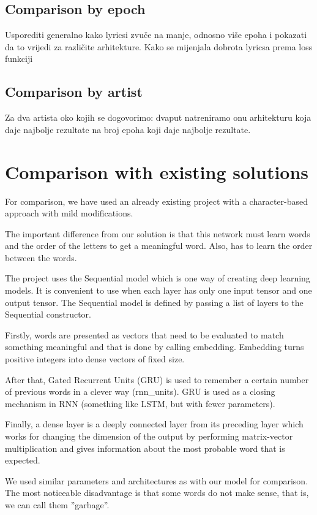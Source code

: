 \documentclass[conference]{IEEEtran}
\begin{document}
\subsection{Comparison by epoch}
Usporediti generalno kako lyricsi zvuče na manje, odnosno više epoha i pokazati
da to vrijedi za različite arhitekture.
Kako se mijenjala dobrota lyricsa prema loss funkciji
\subsection{Comparison by artist}
Za dva artista oko kojih se dogovorimo: dvaput natreniramo onu arhitekturu koja
daje najbolje rezultate na broj epoha koji daje najbolje rezultate.

\section{Comparison with existing solutions}
For comparison, we have used an already existing project with a character-based approach with mild modifications.

The important difference from our solution is that this network must learn words and the order of the letters to get a meaningful word.
Also, has to learn the order between the words.

The project uses the Sequential model which is one way of creating deep learning models. 
It is convenient to use when each layer has only one input tensor and one output
tensor. The Sequential model is defined by passing a list of layers to the Sequential
constructor.

Firstly, words are presented as vectors that need to be evaluated to match
something meaningful and that is done by calling embedding. Embedding turns positive integers
into dense vectors of fixed size. 

After that, Gated Recurrent Units (GRU) is used to remember
a certain number of previous words in a clever way (rnn\_units). GRU is used as a closing mechanism in RNN (something like LSTM, but with fewer parameters). 

Finally, a dense layer is a deeply connected layer
from its preceding layer which works for changing the dimension of the output by
performing matrix-vector multiplication and gives information about the most probable word that
is expected.

We used similar parameters and architectures as with our model for comparison. 
The most noticeable disadvantage is that some words do not make sense, that is, we can call them ''garbage''.
\end{document}

